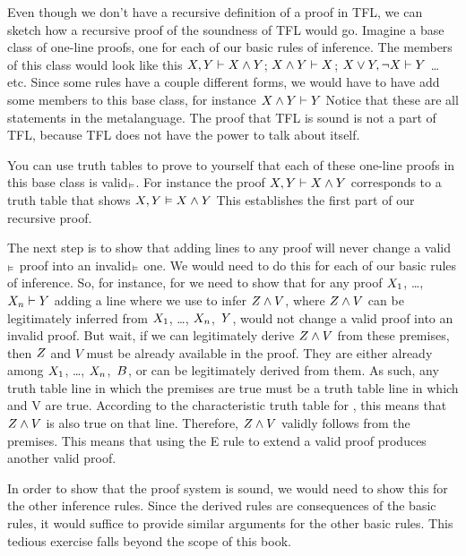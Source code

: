 Even though we don't have a recursive definition of a proof in TFL, we can sketch how a recursive proof of the soundness of TFL would go. Imagine a base class of one-line proofs, one for each of our
basic
rules of inference. The members of this class would look like this $X, Y \vdash  X \mathbin{\wedge} Y$; $X \mathbin{\wedge} Y \vdash X$; $X \vee Y, \neg X \vdash  Y$ \ldots{} etc. Since some rules have a couple different forms, we would have to have add some members to this base class, for instance $X \mathbin{\wedge} Y \vdash  Y$ Notice that these are all statements in the metalanguage. The proof that TFL is sound is not a part of TFL, because TFL does not have the power to talk about itself.

You can use truth tables to prove to yourself that each of these one-line proofs in this base class is valid$_{\vDash}$. For instance the proof $X, Y \vdash X \mathbin{\wedge} Y$ corresponds to a truth table that shows $X, Y \vDash  X \mathbin{\wedge} Y$ This establishes the first part of our recursive proof.

The next step is to show that adding lines to any proof will never change a valid$_{\vDash}$ proof into an invalid$_{\vDash}$ one. We would need to do this for each of our
basic rules of inference. So, for instance, for  we need to show that for any proof $X_{1}$, \dots, $X_{n} \vdash  Y$ adding a line where we use  to infer $Z \mathbin{\wedge} V$, where $Z \mathbin{\wedge} V$ can be legitimately inferred from $X_{1}$, \dots, $X_{n}$,~$Y$, would not change a valid proof into an invalid proof. But wait, if we can legitimately derive $Z \mathbin{\wedge} V$ from these premises, then $Z$ and $V$ must be already available in the proof. They are either already among $X_{1}$, \dots, $X_{n}$,~$B$, or can be legitimately derived from them. As such, any truth table line in which the premises are true must be a truth table line in which \metaZ and V are true. According to the characteristic truth table for \eand, this means that $Z \mathbin{\wedge} V$ is also true on that line. Therefore, $Z \mathbin{\wedge} V$ validly follows from the premises. This means that using the {\eand}E rule to extend a valid proof produces another valid proof.

In order to show that the proof system is sound, we would need to show this for the other inference rules. Since the derived rules are consequences of the basic rules, it would suffice to provide similar arguments for the
other basic rules. This tedious exercise falls beyond the scope of this book.

